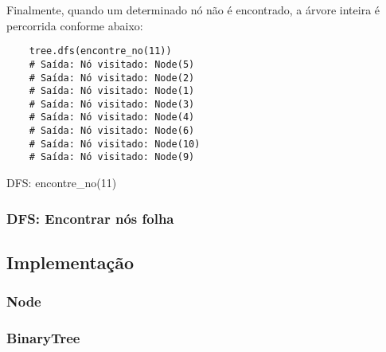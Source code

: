 Finalmente, quando um determinado nó não é encontrado, a árvore inteira é percorrida conforme abaixo:

\begin{listing}[!ht]
    \begin{verbatim}
    tree.dfs(encontre_no(11))
    # Saída: Nó visitado: Node(5)
    # Saída: Nó visitado: Node(2)
    # Saída: Nó visitado: Node(1)
    # Saída: Nó visitado: Node(3)
    # Saída: Nó visitado: Node(4)
    # Saída: Nó visitado: Node(6)
    # Saída: Nó visitado: Node(10)
    # Saída: Nó visitado: Node(9)
    \end{verbatim}
    \caption{DFS: encontre_no(11)}
    \label{listing:dfs-encontra-no-11}
\end{listing}

\subsubsection{DFS: Encontrar nós folha}

\subsection{Implementação}
\subsubsection{Node}
\subsubsection{BinaryTree}
